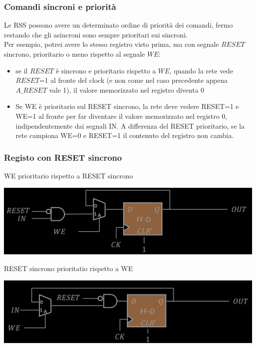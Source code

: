 \documentclass{article}
\begin{document}
\subsubsection*{Comandi sincroni e priorità}
Le RSS possono avere un determinato ordine di priorità dei comandi, fermo restando che gli asincroni sono sempre prioritari sui sincroni.\\
Per esempio, potrei avere lo stesso registro visto prima, ma con segnale $RESET$ sincrono, prioritario o meno rispetto al segnale $WE$:
\begin{itemize}
    \item se il $RESET$ è sincrono e prioritario rispetto a $WE$, quando la rete vede $RESET$=1 al fronte del clock (e non come nel caso precedente appena $A\_RESET$ vale 1), il valore memorizzato nel registro diventa 0
    \item Se WE è prioritario sul RESET sincrono, la rete deve vedere RESET=1 e WE=1 al fronte per far diventare il valore memorizzato nel registro 0, indipendentemente dai segnali IN. A differenza del RESET prioritario, se la rete campiona WE=0 e RESET=1 il contenuto del registro non cambia.
\end{itemize}


\subsubsection*{Registo con RESET sincrono}
\clearpage
WE prioritario rispetto a RESET sincrono
\begin{center}
    \includegraphics[scale=0.35]{we prioritario.png}
\end{center}
RESET sincrono prioritatio rispetto a WE
\begin{center}
    \includegraphics[scale=0.35]{reset prioritario.png}
\end{center}
\end{document}
